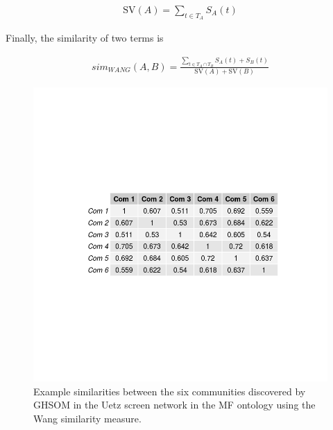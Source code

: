 \documentclass{report}
\begin{document}
	\begin{align}
	\text{SV}(A) = \sum_{t \in T_A} S_A(t)
	\end{align}
	
	Finally, the similarity of two terms is
	
	\begin{align}
	sim_{WANG}(A, B) = \frac{\sum_{t\in T_A \cap T_B}  S_A(t) + S_B(t)}{\text{SV}(A) + \text{SV}(B)}
	\end{align}
	
	
	\begin{figure}
		\centering
		\includegraphics[width=\textwidth]{../wang.png}
		\caption{Example similarities between the six communities discovered by GHSOM in the Uetz screen network in the MF ontology using the Wang similarity measure.}
		\label{wang}
	\end{figure}
	
\end{document}
